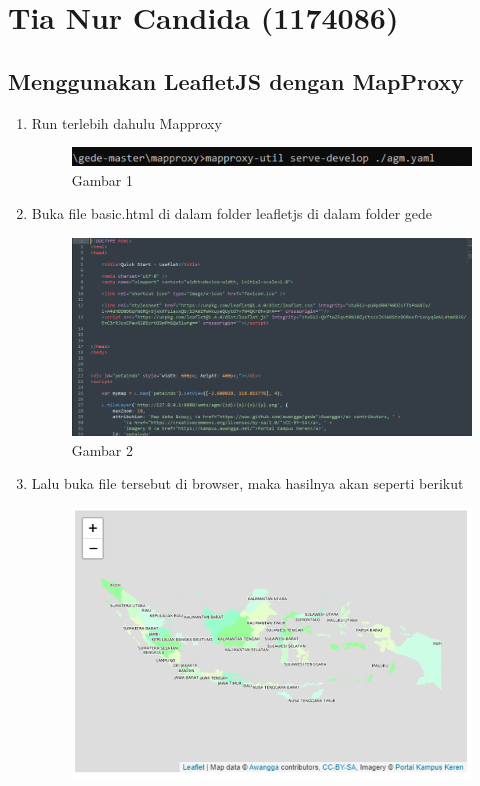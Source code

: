 \section{Tia Nur Candida (1174086)}
\subsection{Menggunakan LeafletJS dengan MapProxy}
\begin{enumerate}
    \item Run terlebih dahulu Mapproxy
    \hfill\break
    \begin{figure}[H]
		\includegraphics[width=12cm]{figures/Tugas5/1174086/1.png}
		\centering
		\caption{Gambar 1}
	\end{figure}
    \item Buka file basic.html di dalam folder leafletjs di dalam folder gede
    \hfill\break
    \begin{figure}[H]
		\includegraphics[width=12cm]{figures/Tugas5/1174086/3.png}
		\centering
		\caption{Gambar 2}
	\end{figure}
    \item Lalu buka file tersebut di browser, maka hasilnya akan seperti berikut
    \hfill\break
    \begin{figure}[H]
		\includegraphics[width=12cm]{figures/Tugas5/1174086/4.png}

\end{figure}
\end{enumerate}
